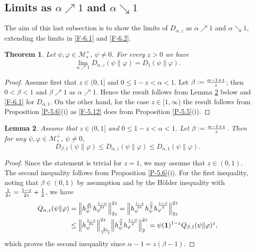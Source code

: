 \documentclass[12pt]{article}
\newtheorem{theorem}{Theorem}[section]
\newtheorem{lemma}[theorem]{Lemma}
\theoremstyle{definition}
\theoremstyle{remark}
\numberwithin{equation}{section}
\def\Me{\mathcal M}
\def\ffi{\varphi}
\def\1{\mathbf{1}}
\begin{document}
\subsection{Limits as $\alpha\nearrow1$ and $\alpha\searrow1$}

The aim of this last subsection is to show the limits of $D_{\alpha,z}$ as $\alpha\nearrow1$ and
$\alpha\searrow1$, extending the limits in \eqref{F-6.1} and \eqref{F-6.2}.

\begin{theorem}\label{T-6.7}
Let $\psi,\ffi\in\Me_*^+$, $\psi\ne0$. For every $z>0$ we have
\[
\lim_{\alpha\nearrow1}D_{\alpha,z}(\psi\|\ffi)=D_1(\psi\|\ffi).
\]
\end{theorem}

\begin{proof}
Assume first that $z\in(0,1]$ and $0\le1-z<\alpha<1$. Let $\beta:={\alpha-1+z\over z}$; then
$0<\beta<1$ and $\beta\nearrow1$ as $\alpha\nearrow1$. Hence the result follows from Lemma \ref{L-6.8}
below and \eqref{F-6.1} for $D_{\alpha,1}$. On the other hand, for the case $z\in[1,\infty)$ the result
follows from Proposition \ref{P-5.6}(i) as \eqref{F-5.12} does from Proposition \ref{P-5.5}(i).
\end{proof}

\begin{lemma}\label{L-6.8}
Assume that $z\in(0,1]$ and $0\le1-z<\alpha<1$. Let $\beta:={\alpha-1+z\over z}$. Then for any
$\psi,\ffi\in\Me_*^+$, $\psi\ne0$,
\[
D_{\beta,1}(\psi\|\ffi)\le D_{\alpha,z}(\psi\|\ffi)\le D_{\alpha,1}(\psi\|\ffi).
\]
\end{lemma}

\begin{proof}
Since the statement is trivial for $z=1$, we may assume that $z\in(0,1)$. The second inequality follows
from Proposition \ref{P-5.6}(i). For the first inequality, noting that $\beta\in(0,1)$ by assumption and 
by the H\"older inequality with ${1\over2z}={1-z\over2z}+{1\over2}$, we have
\begin{align*}
Q_{\alpha,z}(\psi\|\ffi)&=\Big\|h_\psi^{\alpha\over2z}h_\ffi^{1-\alpha\over2z}\Big\|_{2z}^{2z}
=\Big\|h_\psi^{1-z\over2z}h_\psi^{\beta\over2}h_\ffi^{1-\beta\over2}\Big\|_{2z}^{2z} \\
&\le\Big\|h_\psi^{1-z\over2z}\Big\|_{2z\over1-z}^{2z}
\Big\|h_\psi^{\beta\over2}h_\ffi^{1-\beta\over2}\Big\|_2^{2z}
=\psi(\1)^{1-z}Q_{\beta,1}(\psi\|\ffi)^z,
\end{align*}
which proves the second inequality since $\alpha-1=z(\beta-1)$.
\end{proof}
\end{document}
